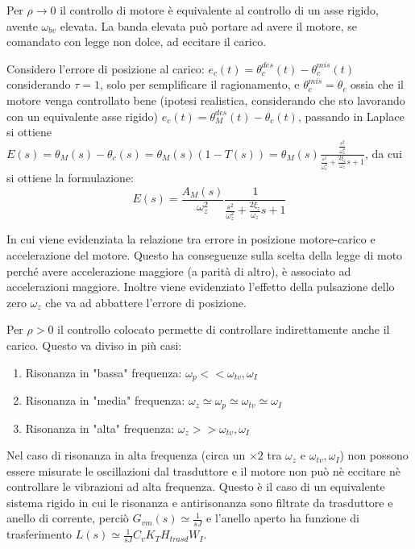 Per \(\rho \rightarrow 0\) il controllo di motore è equivalente al controllo di un asse rigido, avente \(\omega_{bv}\) elevata. La banda elevata può portare ad avere il motore, se comandato con legge non dolce, ad eccitare il carico.

Considero l'errore di posizione al carico: \(e_c(t) = \theta_c^{des}(t) - \theta_c^{mis}(t)\) considerando \(\tau=1\), solo per semplificare il ragionamento, e \(\theta_c^{mis} = \theta_c\) ossia che il motore venga controllato bene (ipotesi realistica, considerando che sto lavorando con un equivalente asse rigido) \(e_c(t) = \theta_M^{des}(t) - \theta_c(t)\), passando in Laplace si ottiene \(E(s) = \theta_M (s) - \theta_c(s) = \theta_M(s) (1 - T(s)) = \theta_M(s) \frac{\frac{s^2}{\omega_z^2}}{\frac{s^2}{\omega_z^2} + \frac{2\xi_z}{\omega_z}s + 1}\), da cui si ottiene la formulazione:
\[
E(s) = \frac{A_M(s)}{\omega_z^2} \frac{1}{\frac{s^2}{\omega_z^2} + \frac{2\xi_z}{\omega_z}s + 1}
\]

In cui viene evidenziata la relazione tra errore in posizione motore-carico e accelerazione del motore. Questo ha conseguenze sulla scelta della legge di moto perché avere accelerazione maggiore (a parità di altro), è associato ad accelerazioni maggiore. Inoltre viene evidenziato l'effetto della pulsazione dello zero \(\omega_z\) che va ad abbattere l'errore di posizione.


Per \(\rho > 0\) il controllo colocato permette di controllare indirettamente anche il carico.
Questo va diviso in più casi:
\begin{enumerate}
    \item Risonanza in "bassa" frequenza: \(\omega_p << \omega_{tv}, \omega_I\)
    \item Risonanza in "media" frequenza: \(\omega_z \simeq \omega_p \simeq \omega_{tv} \simeq \omega_I\)
    \item Risonanza in "alta" frequenza: \(\omega_z >> \omega_{tv}, \omega_I\)
\end{enumerate} 

Nel caso di risonanza in alta frequenza (circa un \(\times 2\) tra \(\omega_z\) e \(\omega_{tv},\omega_I\)) non possono essere misurate le oscillazioni dal trasduttore e il motore non può nè eccitare nè controllare le vibrazioni ad alta frequenza. Questo è il caso di un equivalente sistema rigido in cui le risonanza e antirisonanza sono filtrate da trasduttore e anello di corrente, perciò \(G_{vm}(s) \simeq \frac{1}{sJ}\) e l'anello aperto ha funzione di trasferimento \(L(s) \simeq \frac{1}{sJ} C_v K_T H_{trasd} W_I\).


